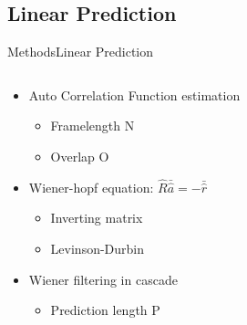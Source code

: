 \subsection{Linear Prediction}
\begin{frame}{Methods}{Linear Prediction}		
		\begin{columns}
			\begin{column}{0.5\textwidth}
			\begin{itemize}
				\item Auto Correlation Function estimation 
				\begin{itemize}
					\item Framelength N
					\item Overlap O
				\end{itemize}
				\item Wiener-hopf equation: $\hat{R}  \bar{\hat{a}} = -\bar{\hat{r}}$
				\begin{itemize}
					\item Inverting matrix
					\item Levinson-Durbin
				\end{itemize}
				\item Wiener filtering in cascade
				\begin{itemize}
					\item Prediction length P
				\end{itemize}
			\end{itemize}
			\end{column}
			\begin{column}{0.5\textwidth} 
			\resizebox{1.0\columnwidth}{!}{		
			}
			\end{column}
		\end{columns}
\end{frame}


